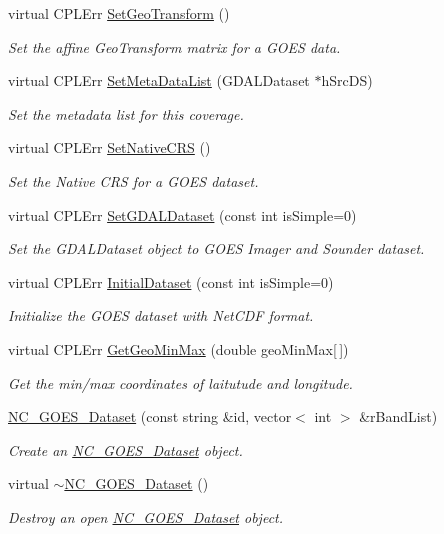 \begin{DoxyCompactItemize}
\item 
virtual CPLErr \hyperlink{classNC__GOES__Dataset_ada85679c832ad2ff971d6291ccf9b8f8}{SetGeoTransform} ()
\begin{DoxyCompactList}\small\item\em Set the affine GeoTransform matrix for a GOES data. \end{DoxyCompactList}\item 
virtual CPLErr \hyperlink{classNC__GOES__Dataset_ae5e798ca0bb105513a80fcdb0b5cf9d8}{SetMetaDataList} (GDALDataset $\ast$hSrcDS)
\begin{DoxyCompactList}\small\item\em Set the metadata list for this coverage. \end{DoxyCompactList}\item 
virtual CPLErr \hyperlink{classNC__GOES__Dataset_abc062e894fdf1731f5b258091ffcc5ea}{SetNativeCRS} ()
\begin{DoxyCompactList}\small\item\em Set the Native CRS for a GOES dataset. \end{DoxyCompactList}\item 
virtual CPLErr \hyperlink{classNC__GOES__Dataset_a2ec90aa02b68185edbdd1fa00727ed10}{SetGDALDataset} (const int isSimple=0)
\begin{DoxyCompactList}\small\item\em Set the GDALDataset object to GOES Imager and Sounder dataset. \end{DoxyCompactList}\item 
virtual CPLErr \hyperlink{classNC__GOES__Dataset_a128b874278c0ad4dd093baf22bf8d23f}{InitialDataset} (const int isSimple=0)
\begin{DoxyCompactList}\small\item\em Initialize the GOES dataset with NetCDF format. \end{DoxyCompactList}\item 
virtual CPLErr \hyperlink{classNC__GOES__Dataset_a5d2fa4d635bae04a1b488b1917dd7ab3}{GetGeoMinMax} (double geoMinMax\mbox{[}$\,$\mbox{]})
\begin{DoxyCompactList}\small\item\em Get the min/max coordinates of laitutude and longitude. \end{DoxyCompactList}\item 
\hyperlink{classNC__GOES__Dataset_a481c60e90f61c2ff2fa82dfe78eed0ba}{NC\_\-GOES\_\-Dataset} (const string \&id, vector$<$ int $>$ \&rBandList)
\begin{DoxyCompactList}\small\item\em Create an \hyperlink{classNC__GOES__Dataset}{NC\_\-GOES\_\-Dataset} object. \end{DoxyCompactList}\item 
virtual \hyperlink{classNC__GOES__Dataset_a89368fa51f93a6eb45529d4c484cee64}{$\sim$NC\_\-GOES\_\-Dataset} ()
\begin{DoxyCompactList}\small\item\em Destroy an open \hyperlink{classNC__GOES__Dataset}{NC\_\-GOES\_\-Dataset} object. \end{DoxyCompactList}\end{DoxyCompactItemize}
